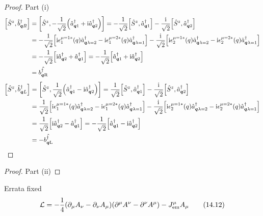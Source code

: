 \documentclass[letterpaper]{article}
\theoremstyle{definition}
\begin{document}
\begin{proof}Part (i)
  \begin{align*}
    \bqty{\hat{S}^z,\hat{b}^\dagger_{\vb*{q}R}} & =\bqty{\hat{S}^z,-\frac{1}{\sqrt{2}}\pqty{\hat{a}^\dagger_{\vb*{q}1}+\text{i}\hat{a}^\dagger_{\vb*{q}2}}}=-\frac{1}{\sqrt{2}}\bqty{\hat{S}^z,\hat{a}^\dagger_{\vb*{q}1}}-\frac{\text{i}}{\sqrt{2}}\bqty{\hat{S}^z,\hat{a}^\dagger_{\vb*{q}2}}                                                                                  \\
                                                & =-\frac{1}{\sqrt{2}}\bqty{\text{i}\epsilon^{\mu=1*}_1(q)\hat{a}^\dagger_{\vb*{q}\lambda=2}-\text{i}\epsilon^{\mu=2*}_1(q)\hat{a}^\dagger_{\vb*{q}\lambda=1}}-\frac{\text{i}}{\sqrt{2}}\bqty{\text{i}\epsilon^{\mu=1*}_2(q)\hat{a}^\dagger_{\vb*{q}\lambda=2}-\text{i}\epsilon^{\mu=2*}_2(q)\hat{a}^\dagger_{\vb*{q}\lambda=1}} \\
                                                & =-\frac{1}{\sqrt{2}}\bqty{\text{i}\hat{a}^\dagger_{\vb*{q}2}+\hat{a}^\dagger_{\vb*{q}1}}=-\frac{1}{\sqrt{2}}\bqty{\hat{a}^\dagger_{\vb*{q}1}+\text{i}\hat{a}^\dagger_{\vb*{q}2}}                                                                                                                                               \\
                                                & =\hat{b^\dagger_{\vb*{q}\text{R}}}
  \end{align*}
  \begin{align*}
    \bqty{\hat{S}^z,\hat{b}^\dagger_{\vb*{q}L}} & =\bqty{\hat{S}^z,\frac{1}{\sqrt{2}}\pqty{\hat{a}^\dagger_{\vb*{q}1}-\text{i}\hat{a}^\dagger_{\vb*{q}2}}}=\frac{1}{\sqrt{2}}\bqty{\hat{S}^z,\hat{a}^\dagger_{\vb*{q}1}}-\frac{\text{i}}{\sqrt{2}}\bqty{\hat{S}^z,\hat{a}^\dagger_{\vb*{q}2}}                                                                                   \\
                                                & =\frac{1}{\sqrt{2}}\bqty{\text{i}\epsilon^{\mu=1*}_1(q)\hat{a}^\dagger_{\vb*{q}\lambda=2}-\text{i}\epsilon^{\mu=2*}_1(q)\hat{a}^\dagger_{\vb*{q}\lambda=1}}-\frac{\text{i}}{\sqrt{2}}\bqty{\text{i}\epsilon^{\mu=1*}_2(q)\hat{a}^\dagger_{\vb*{q}\lambda=2}-\text{i}\epsilon^{\mu=2*}_2(q)\hat{a}^\dagger_{\vb*{q}\lambda=1}} \\
                                                & =\frac{1}{\sqrt{2}}\bqty{\text{i}\hat{a}^\dagger_{\vb*{q}2}-\hat{a}^\dagger_{\vb*{q}1}}=-\frac{1}{\sqrt{2}}\bqty{\hat{a}^\dagger_{\vb*{q}1}-\text{i}\hat{a}^\dagger_{\vb*{q}2}}                                                                                                                                               \\
                                                & =-\hat{b^\dagger_{\vb*{q}\text{L}}}
  \end{align*}
\end{proof}

\begin{proof}Part (ii)
\end{proof}

Errata fixed
\[\mathcal{L}=-\frac{1}{4}\pqty{\partial_\mu A_\nu-\partial_\nu A_\mu}\pqty{\partial^\mu A^\nu-\partial^\nu A^\mu}-J^\mu_{\text{em}}A_\mu \qquad(14.12)\]
\end{document}

